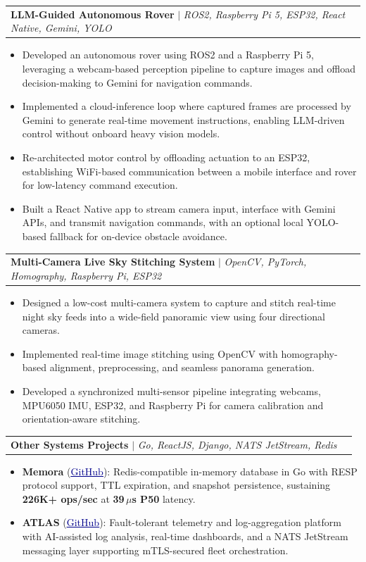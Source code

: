 \documentclass[letterpaper,9pt]{extarticle}
\makeatletter
\newcommand{\resumeItem}[1]{
  \item\small{#1}
}
\newcommand{\resumeProjectHeading}[3]{
  \vspace{1pt}\item
  \begin{tabular*}{0.97\textwidth}[t]{l@{\extracolsep{\fill}}r}
    \small#1 & \small#2\ifblank{#3}{}{\ifblank{#2}{}{\ $|$\ }\href{#3}{\textcolor{darkblue}{\underline{GitHub}}}} \\
  \end{tabular*}
  \vspace{-2pt}
}
\newcommand{\resumeItemListStart}{\begin{itemize}[leftmargin=0.2in]}
\newcommand{\resumeItemListEnd}{\end{itemize}\vspace{1pt}}
\makeatother
\begin{document}
\vspace{-3pt}

\resumeProjectHeading
  {\textbf{LLM-Guided Autonomous Rover} $|$ \emph{ROS2, Raspberry Pi 5, ESP32, React Native, Gemini, YOLO}}
  {}
  {}
\resumeItemListStart
  \resumeItem{Developed an autonomous rover using ROS2 and a Raspberry Pi 5, leveraging a webcam-based perception pipeline to capture images and offload decision-making to Gemini for navigation commands.}
  \resumeItem{Implemented a cloud-inference loop where captured frames are processed by Gemini to generate real-time movement instructions, enabling LLM-driven control without onboard heavy vision models.}
  \resumeItem{Re-architected motor control by offloading actuation to an ESP32, establishing WiFi-based communication between a mobile interface and rover for low-latency command execution.}
  \resumeItem{Built a React Native app to stream camera input, interface with Gemini APIs, and transmit navigation commands, with an optional local YOLO-based fallback for on-device obstacle avoidance.}
\resumeItemListEnd

\vspace{-3pt}

\resumeProjectHeading
  {\textbf{Multi-Camera Live Sky Stitching System} $|$ \emph{OpenCV, PyTorch, Homography, Raspberry Pi, ESP32}}
  {}
  {}
\resumeItemListStart
  \resumeItem{Designed a low-cost multi-camera system to capture and stitch real-time night sky feeds into a wide-field panoramic view using four directional cameras.}
  \resumeItem{Implemented real-time image stitching using OpenCV with homography-based alignment, preprocessing, and seamless panorama generation.}
  \resumeItem{Developed a synchronized multi-sensor pipeline integrating webcams, MPU6050 IMU, ESP32, and Raspberry Pi for camera calibration and orientation-aware stitching.}
\resumeItemListEnd

\vspace{-3pt}

\resumeProjectHeading
  {\textbf{Other Systems Projects} $|$ \emph{Go, ReactJS, Django, NATS JetStream, Redis}}
  {}
  {}
\resumeItemListStart
  \resumeItem{\textbf{Memora} (\href{https://github.com/Jishnu-Prasad888/Memora}{\textcolor{darkblue}{\underline{GitHub}}}): Redis-compatible in-memory database in Go with RESP protocol support, TTL expiration, and snapshot persistence, sustaining \textbf{226K+ ops/sec} at \textbf{39\,$\mu$s P50} latency.}
  \resumeItem{\textbf{ATLAS} (\href{https://github.com/Jishnu-Prasad888/ATLAS}{\textcolor{darkblue}{\underline{GitHub}}}): Fault-tolerant telemetry and log-aggregation platform with AI-assisted log analysis, real-time dashboards, and a NATS JetStream messaging layer supporting mTLS-secured fleet orchestration.}
\resumeItemListEnd
\end{document}
